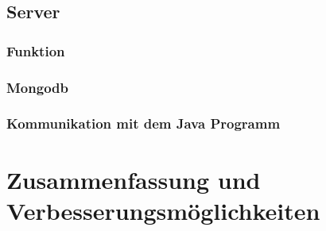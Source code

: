 \subsection{Server}

\subsubsection{Funktion}

\subsubsection{Mongodb}

\subsubsection{Kommunikation mit dem Java Programm}

\section{Zusammenfassung und Verbesserungsmöglichkeiten}